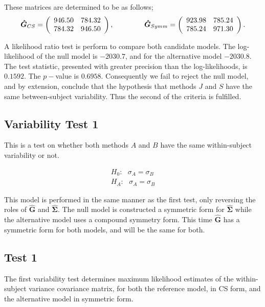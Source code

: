 \documentclass[12pt, a4paper]{report}
\theoremstyle{plain}
\theoremstyle{definition}
\theoremstyle{remark}
\begin{document}
These matrices are determined to be as follows;
\[
\boldsymbol{\hat{G}}_{CS} = \left( \begin{array}{cc}
946.50 & 784.32  \\
784.32 & 946.50  \\
\end{array}\right),
\hspace{1.5cm}
\boldsymbol{\hat{G}}_{Symm} = \left( \begin{array}{cc}
923.98 & 785.24  \\
785.24 & 971.30  \\
\end{array}\right).
\]

A likelihood ratio test is perform to compare both candidate models. The log-likelihood of the null model is $-2030.7$, and for the alternative model $-2030.8$. The test statistic, presented with greater precision than the log-likelihoods, is $0.1592$. The $p-$value is $0.6958$. Consequently we fail to reject the null model, and by extension, conclude that the hypothesis that methods $J$ and $S$ have the same between-subject variability. Thus the second of the criteria is fulfilled.

\subsection{Variability Test 1}

This is a test on whether both methods $A$ and $B$ have the same within-subject variability or not.

\begin{eqnarray}
H_{0}: \mbox{ }\sigma_{A}  = \sigma_{B} \\
H_{A}: \mbox{ }\sigma_{A}  = \sigma_{B}
\end{eqnarray}

This model is performed in the same manner as the first test, only reversing the roles of $\boldsymbol{\hat{G}}$ and $\boldsymbol{\hat{\Sigma}}$. The null model is constructed  a symmetric form for $\boldsymbol{\hat{\Sigma}}$ while the alternative model uses a compound symmetry form. This time $\boldsymbol{\hat{G}}$ has a symmetric form for both models, and will be the same for both.
\subsection{Test 1}
The first variability test determines maximum likelihood estimates of the within-subject variance covariance matrix, for both the reference model, in CS form, and the alternative model in symmetric form.
\end{document}

